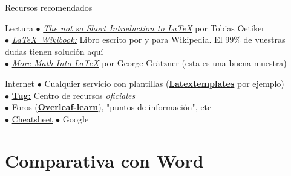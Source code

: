 \documentclass[12pt]{beamer}
\begin{document}
\begin{frame}{Recursos recomendados}
\begin{block}{Lectura}
	$\bullet$ \href{https://tobi.oetiker.ch/lshort/lshort.pdf}{\textit{The not so Short Introduction to \LaTeX}} por Tobias Oetiker \\
	$\bullet$ \href{https://en.wikibooks.org/wiki/LaTeX}{\textit{\LaTeX\ Wikibook:}} Libro escrito por y para Wikipedia. El 99\% de vuestras dudas tienen solución aquí \\
	$\bullet$ \href{http://osl.ugr.es/CTAN/info/Math_into_LaTeX-4/Short_Course.pdf}{\textit{More Math Into \LaTeX}} por George Grätzner (esta es una buena muestra)
\end{block}
\begin{block}{Internet}
	$\bullet$ Cualquier servicio con plantillas (\href{http://www.latextemplates.com/}{\textbf{Latextemplates}} por ejemplo) \\
	$\bullet$ \href{https://www.tug.org/begin.html}{\textbf{Tug:}} Centro de recursos \textit{oficiales} \\
	$\bullet$ Foros (\href{https://www.overleaf.com/learn}{\underline{\textbf{Overleaf-learn}}}), "puntos de información", etc \\
	$\bullet$ \href{http://www.latex4ei.de/downloads/LaTeX_CheatSheet.pdf}{Cheatsheet}
	$\bullet$ Google
\end{block}

\end{frame}

\section{Comparativa con Word}
\end{document}
